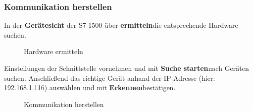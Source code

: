 \clearpage

\subsubsection{Kommunikation herstellen}
In der \textbf{Gerätesicht} der S7-1500 über \glqq\textbf{ermitteln}\grqq\:die entsprechende Hardware suchen.
\begin{figure}[H]
   \centering
   \caption[Hardware ermitteln]{Hardware ermitteln}
   \label{fig:Bild6.9}
\end{figure}

Einstellungen der Schnittstelle vornehmen und mit \glqq\textbf{Suche starten}\grqq\:nach Geräten suchen. Anschließend das richtige Gerät anhand der IP-Adresse (hier: 192.168.1.116) auswählen und mit \glqq\textbf{Erkennen}\grqq\:bestätigen.
\begin{figure}[H]
   \centering
   \caption[Kommunikation herstellen]{Kommunikation herstellen}
   \label{fig:Bild6.10}
\end{figure}

